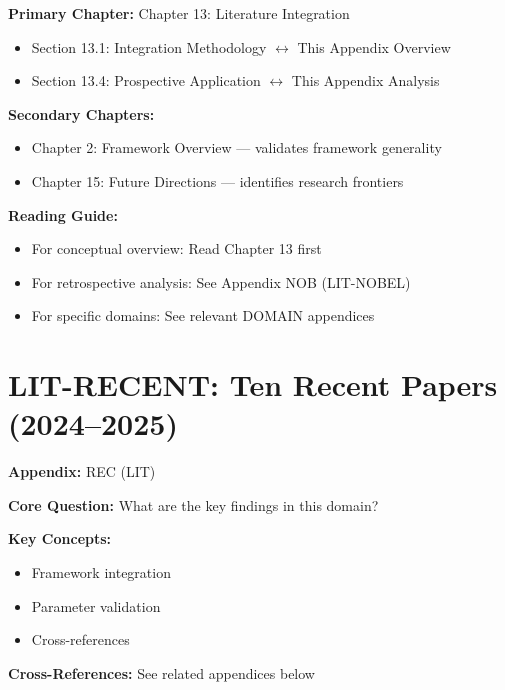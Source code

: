 \begin{tcolorbox}[colback=purple!5!white, colframe=purple!75!black,
    title=Chapter Linkage]

\textbf{Primary Chapter:} Chapter 13: Literature Integration
\begin{itemize}[nosep]
\item Section 13.1: Integration Methodology $\leftrightarrow$ This Appendix Overview
\item Section 13.4: Prospective Application $\leftrightarrow$ This Appendix Analysis
\end{itemize}

\textbf{Secondary Chapters:}
\begin{itemize}[nosep]
\item Chapter 2: Framework Overview --- validates framework generality
\item Chapter 15: Future Directions --- identifies research frontiers
\end{itemize}

\textbf{Reading Guide:}
\begin{itemize}[nosep]
\item For conceptual overview: Read Chapter 13 first
\item For retrospective analysis: See Appendix NOB (LIT-NOBEL)
\item For specific domains: See relevant DOMAIN appendices
\end{itemize}

\end{tcolorbox}

\chapter{LIT-RECENT: Ten Recent Papers (2024--2025)}
\label{app:recentpapers}

\begin{tcolorbox}[colback=blue!5!white, colframe=blue!75!black,
    title=Quick Reference: Appendix REC]

\textbf{Appendix:} REC (LIT)

\textbf{Core Question:} What are the key findings in this domain?

\textbf{Key Concepts:}
\begin{itemize}[nosep]
\item Framework integration
\item Parameter validation
\item Cross-references
\end{itemize}

\textbf{Cross-References:} See related appendices below
\end{tcolorbox}

